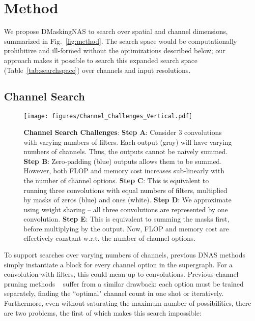 \documentclass[10pt,twocolumn,letterpaper]{article}
\begin{document}
\section{Method}

We propose DMaskingNAS to search over spatial and channel dimensions, summarized in Fig.~\ref{fig:method}. 
The search space would be computationally prohibitive and ill-formed without the optimizations described below; our approach makes it possible to search this expanded search space (Table~\ref{tab:searchspace}) over channels and input resolutions.

\subsection{Channel Search}\label{sec:channel-search}

\begin{figure}
    \centering
    \texttt{[image: figures/Channel\_Challenges\_Vertical.pdf]}
    \caption{\textbf{Channel Search Challenges}: \textbf{Step A}: Consider 3 convolutions with varying numbers of filters. Each output (gray) will have varying numbers of channels. Thus, the outputs cannot be naively summed. \textbf{Step B}: Zero-padding (blue) outputs allows them to be summed. However, both FLOP and memory cost increases sub-linearly with the number of channel options. \textbf{Step C}: This is equivalent to running three convolutions with equal numbers of filters, multiplied by masks of zeros (blue) and ones (white). \textbf{Step D}: We approximate using weight sharing -- all three convolutions are represented by one convolution. \textbf{Step E}: This is equivalent to summing the masks first, before multiplying by the output. Now, FLOP and memory cost are effectively constant w.r.t. the number of channel options. }
    \label{fig:channel_challenges}
\end{figure}

To support searches over varying numbers of channels, previous DNAS methods simply instantiate a block for every channel option in the supergraph. For a convolution with  filters, this could mean up to  convolutions. Previous channel pruning methods ~\cite{autoslim} suffer from a similar drawback: each option must be trained separately, finding the ``optimal" channel count in one shot or iteratively.
Furthermore, even without saturating the maximum number of possibilities, there are two problems, the first of which makes this search impossible:
\end{document}
